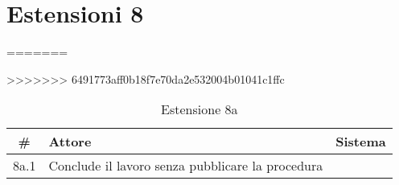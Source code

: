 \section*{Estensioni 8}
=======
>>>>>>> 6491773aff0b18f7e70da2e532004b01041c1ffc
\begin{table}[H]\centering\caption*{Estensione 8a}
      \small
      \begin{tabular}{|c|p{7cm}|p{6.24cm}|}
            \hline\bfseries \# & \bfseries Attore                                 & \bfseries Sistema \\\hline
            8a.1               & Conclude il lavoro senza pubblicare la procedura &                   \\\hline
      \end{tabular}
\end{table}
\normalsize